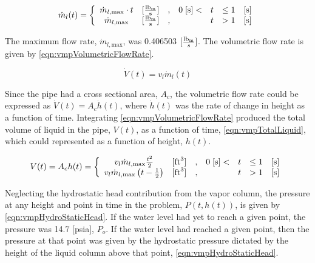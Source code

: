 \begin{equation}
\label{eqn:vmpMassFlowRate}
\dot{m}_{l}(t) = \left\{
\begin{array}{cclrcll}
 \dot{m}_{l,\text{max}}\cdot t & [\frac{ \lbm{} }{\text{s}}] & , & 0\; [\text{s}] < & t & \leq 1 & [\text{s}] \\
 \dot{m}_{l,\text{max}}        & [\frac{ \lbm{} }{\text{s}}] & , &                  & t & > 1    & [\text{s}]
\end{array}\right.
\end{equation}

The maximum flow rate, $\dot{m}_{l,\text{max}}$, was 0.406503 $ [ \frac{\lbm{}}{s} ]$.
The volumetric flow rate is given by \eqref{eqn:vmpVolumetricFlowRate}.

\begin{equation}
\label{eqn:vmpVolumetricFlowRate}
\dot{V}(t) = v_{l} \dot{m}_{l}(t)
\end{equation}

Since the pipe had a cross sectional area, $A_{c}$, the volumetric flow rate could be expressed as $\dot{V}(t) = A_{c} \dot{h}(t)$, where $\dot{h}(t)$ was the rate of change in height as a function of time.
Integrating \eqref{eqn:vmpVolumetricFlowRate} produced the total volume of liquid in the pipe, $V(t)$, as a function of time, \eqref{eqn:vmpTotalLiquid}, which could represented as a function of height, $h(t)$.

\begin{equation}
\label{eqn:vmpTotalLiquid}
V(t) = A_{c} h(t) = 
 \left\{
\begin{array}{cclrcll}
v_{l} \dot{m}_{l,\text{max}}\frac{t^{2}}{2} & [ \text{ft}^{3} ] & , & 0\; [\text{s}] < & t & \leq 1 & [\text{s}] \\
v_{l} \dot{m}_{l,\text{max}} \left( t - \onehalf  \right) & [ \text{ft}^{3} ] & , &                  & t & > 1    & [\text{s}]
\end{array}\right.
\end{equation}

Neglecting the hydrostatic head contribution from the vapor column, the pressure at any height and point in time in the problem, $P(t, h(t))$, is given by \eqref{eqn:vmpHydroStaticHead}.
If the water level had yet to reach a given point, the pressure was  14.7 [psia], $P_o$.
If the water level had reached a given point, then the pressure at that point was given by the hydrostatic pressure dictated by the height of the liquid column above that point, \eqref{eqn:vmpHydroStaticHead}.

